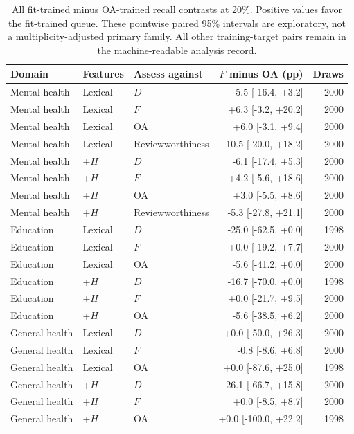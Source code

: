 \begin{table}[htbp]
\centering\small
\caption{All fit-trained minus OA-trained recall contrasts at 20\%. Positive values favor the fit-trained queue. These pointwise paired 95\% intervals are exploratory, not a multiplicity-adjusted primary family. All other training-target pairs remain in the machine-readable analysis record.}
\label{tab:transfercontrasts}
\begin{tabular}{lllrr}
\toprule
Domain & Features & Assess against & $F$ minus OA (pp) & Draws \\
\midrule
Mental health & Lexical & $D$ & -5.5 [-16.4, +3.2] & 2000 \\
Mental health & Lexical & $F$ & +6.3 [-3.2, +20.2] & 2000 \\
Mental health & Lexical & OA & +6.0 [-3.1, +9.4] & 2000 \\
Mental health & Lexical & Reviewworthiness & -10.5 [-20.0, +18.2] & 2000 \\
Mental health & +$H$ & $D$ & -6.1 [-17.4, +5.3] & 2000 \\
Mental health & +$H$ & $F$ & +4.2 [-5.6, +18.6] & 2000 \\
Mental health & +$H$ & OA & +3.0 [-5.5, +8.6] & 2000 \\
Mental health & +$H$ & Reviewworthiness & -5.3 [-27.8, +21.1] & 2000 \\
Education & Lexical & $D$ & -25.0 [-62.5, +0.0] & 1998 \\
Education & Lexical & $F$ & +0.0 [-19.2, +7.7] & 2000 \\
Education & Lexical & OA & -5.6 [-41.2, +0.0] & 2000 \\
Education & +$H$ & $D$ & -16.7 [-70.0, +0.0] & 1998 \\
Education & +$H$ & $F$ & +0.0 [-21.7, +9.5] & 2000 \\
Education & +$H$ & OA & -5.6 [-38.5, +6.2] & 2000 \\
General health & Lexical & $D$ & +0.0 [-50.0, +26.3] & 2000 \\
General health & Lexical & $F$ & -0.8 [-8.6, +6.8] & 2000 \\
General health & Lexical & OA & +0.0 [-87.6, +25.0] & 1998 \\
General health & +$H$ & $D$ & -26.1 [-66.7, +15.8] & 2000 \\
General health & +$H$ & $F$ & +0.0 [-8.5, +8.7] & 2000 \\
General health & +$H$ & OA & +0.0 [-100.0, +22.2] & 1998 \\
\bottomrule
\end{tabular}
\end{table}
